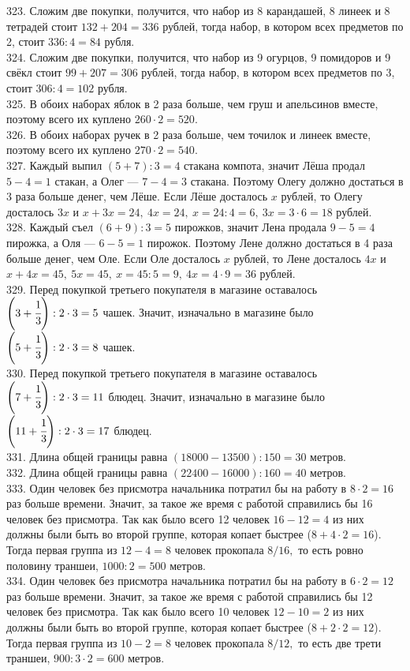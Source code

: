 323. Сложим две покупки, получится, что набор из 8 карандашей, 8 линеек и 8 тетрадей стоит $132+204=336$ рублей, тогда набор, в котором всех предметов по 2, стоит $336:4=84$ рубля.\\
324. Сложим две покупки, получится, что набор из 9 огурцов, 9 помидоров и 9 свёкл стоит $99+207=306$ рублей, тогда набор, в котором всех предметов по 3, стоит $306:4=102$ рубля.\\
325. В обоих наборах яблок в 2 раза больше, чем груш и апельсинов вместе, поэтому всего их куплено $260\cdot2=520.$\\
326. В обоих наборах ручек в 2 раза больше, чем точилок и линеек вместе, поэтому всего их куплено $270\cdot2=540.$\\
327. Каждый выпил $(5+7):3=4$ стакана компота, значит Лёша продал $5-4=1$ стакан, а Олег --- $7-4=3$ стакана. Поэтому Олегу должно достаться в 3 раза больше денег, чем Лёше. Если Лёше досталось $x$ рублей, то Олегу досталось $3x$ и $x+3x=24,\ 4x=24,\ x=24:4=6,\ 3x=3\cdot6=18$ рублей.\\
328. Каждый съел $(6+9):3=5$ пирожков, значит Лена продала $9-5=4$ пирожка, а Оля --- $6-5=1$ пирожок. Поэтому Лене должно достаться в 4 раза больше денег, чем Оле. Если Оле досталось $x$ рублей, то Лене досталось $4x$ и $x+4x=45,\ 5x=45,\ x=45:5=9,\ 4x=4\cdot9=36$ рублей.\\
329. Перед покупкой третьего покупателя в магазине оставалось $\left(3+\cfrac{1}{3}\right):2\cdot3=5$ чашек. Значит, изначально в магазине было $\left(5+\cfrac{1}{3}\right):2\cdot3=8$ чашек.\\
330. Перед покупкой третьего покупателя в магазине оставалось $\left(7+\cfrac{1}{3}\right):2\cdot3=11$ блюдец. Значит, изначально в магазине было $\left(11+\cfrac{1}{3}\right):2\cdot3=17$ блюдец.\\
331. Длина общей границы равна $(18000-13500):150=30$ метров.\\
332. Длина общей границы равна $(22400-16000):160=40$ метров.\\
333. Один человек без присмотра начальника потратил бы на работу в $8\cdot2=16$ раз больше времени. Значит, за такое же время с работой справились бы 16 человек без присмотра. Так как было всего 12 человек $16-12=4$ из них должны были быть во второй группе, которая копает быстрее ($8+4\cdot2=16$). Тогда первая группа из $12-4=8$ человек прокопала $8/16,$ то есть ровно половину траншеи, $1000:2=500$ метров.\\
334. Один человек без присмотра начальника потратил бы на работу в $6\cdot2=12$ раз больше времени. Значит, за такое же время с работой справились бы 12 человек без присмотра. Так как было всего 10 человек $12-10=2$ из них должны были быть во второй группе, которая копает быстрее ($8+2\cdot2=12$). Тогда первая группа из $10-2=8$ человек прокопала $8/12,$ то есть две трети траншеи, $900:3\cdot2=600$ метров.\\
